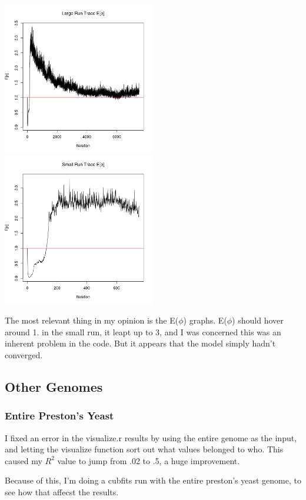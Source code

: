 \includegraphics[width=0.5\textwidth]{data/ephi_largerun.png}
\includegraphics[width=0.5\textwidth]{data/ephi_smallrun.png}

The most relevant thing in my opinion is the E($\phi$) graphs. E($\phi$) should hover around 1. in the small run, it leapt up to 3, and I was concerned this was an inherent problem in the code. But it appears that the model simply hadn't converged.

\subsection{Other Genomes}

\subsubsection{Entire Preston's Yeast}

I fixed an error in the visualize.r results by using the entire genome as the input, and letting the visualize function sort out what values belonged to who. This caused my $R^2$ value to jump from .02 to .5, a huge improvement.

Because of this, I'm doing a cubfits run with the entire preston's yeast genome, to see how that affecst the results.

